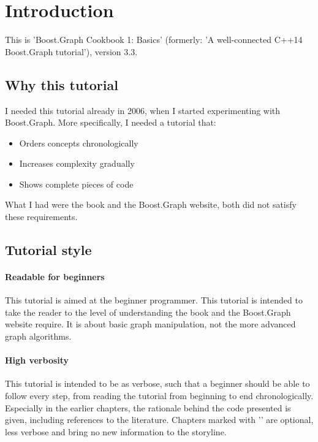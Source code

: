 \section{Introduction}

This is 'Boost.Graph Cookbook 1: Basics' (formerly: 'A well-connected C++14
 Boost.Graph tutorial'), version 3.3.

\subsection{Why this tutorial}

I needed this tutorial already in 2006, when I started experimenting with
Boost.Graph.
More specifically, I needed a tutorial that:

\begin{itemize}
  \item Orders concepts chronologically
  \item Increases complexity gradually
  \item Shows complete pieces of code
\end{itemize}

What I had were the book \cite{siek2001boost}
and the Boost.Graph website, both did not satisfy these requirements.

\subsection{Tutorial style}

\paragraph{Readable for beginners}

This tutorial is aimed at the beginner programmer.
This tutorial is intended to take the reader to the level of understanding
the book \cite{siek2001boost}
and the Boost.Graph website require.
It is about basic graph manipulation, not the more advanced graph algorithms.
 
\paragraph{High verbosity}

This tutorial is intended to be as verbose, such that a beginner should
be able to follow every step, from reading the tutorial from beginning
to end chronologically.
Especially in the earlier chapters, the rationale behind the code presented
is given, including references to the literature.
Chapters marked with '\triangle' are optional, less verbose and bring no new information to the storyline.

